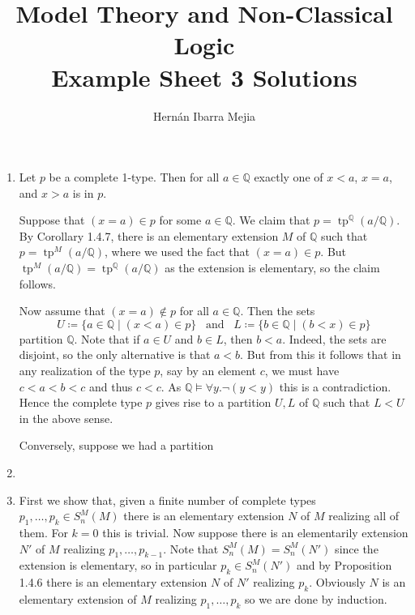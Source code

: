 \documentclass{article}
\theoremstyle{theorem}
\DeclareMathOperator{\tp}{tp}
\begin{document}
	\title{Model Theory and Non-Classical Logic\\ Example Sheet 3 Solutions}
	\author{Hernán Ibarra Mejia}
	\maketitle
	\begin{enumerate}[leftmargin=*]
		\item Let $p$ be a complete 1-type. Then for all $a\in \mathbb{Q}$ exactly one of $x<a$, $x=a$, and $x>a$ is in $p$.
		
		Suppose that $(x=a)\in p$ for some $a\in\mathbb{Q}$. We claim that $p = \tp^\mathbb{Q}(a/\mathbb{Q})$. By Corollary 1.4.7, there is an elementary extension $M$ of $\mathbb{Q}$ such that $p = \tp^{M}(a/\mathbb{Q})$, where we used the fact that $(x=a)\in p$. But $\tp^{M}(a/\mathbb{Q})=\tp^\mathbb{Q}(a/\mathbb{Q})$ as the extension is elementary, so the claim follows.
		
		Now assume that $(x=a)\notin p$ for all $a\in\mathbb{Q}$. Then the sets
		\[
			U\coloneqq \{a\in\mathbb{Q}\mid (x<a)\in p\} \,\,\,\text{ and }\,\,\, L\coloneqq \{b\in\mathbb{Q} \mid (b<x)\in p\}
		\]
		partition $\mathbb{Q}$. Note that if $a\in U$ and $b\in L$, then $b<a$. Indeed, the sets are disjoint, so the only alternative is that $a<b$. But from this it follows that in any realization of the type $p$, say by an element $c$, we must have $c<a<b<c$ and thus $c<c$. As $\mathbb{Q}\models \forall y. \neg(y<y)$ this is a contradiction. Hence the complete type $p$ gives rise to a partition $U,L$ of $\mathbb{Q}$ such that $L<U$ in the above sense.
		
		Conversely, suppose we had a partition 
		\item 
		\item First we show that, given a finite number of complete types $p_1,\ldots,p_k\in S_{n}^M(M)$ there is an elementary extension $N$ of $M$ realizing all of them. For $k=0$ this is trivial. Now suppose there is an elementarily extension $N'$ of $M$ realizing $p_1,\ldots,p_{k-1}$. Note that $S_{n}^M(M)= S_n^{M}(N')$ since the extension is elementary, so in particular $p_k\in S_n^{M}(N')$ and by Proposition 1.4.6 there is an elementary extension $N$ of $N'$ realizing $p_k$. Obviously $N$ is an elementary extension of $M$ realizing $p_1,\ldots, p_k$ so we are done by induction.
		

\end{enumerate}
\end{document}
